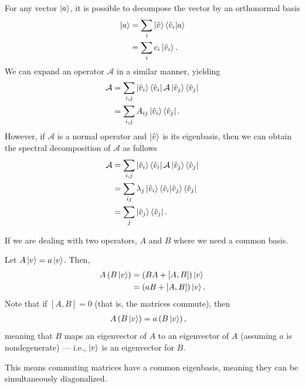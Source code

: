 \documentclass[10pt]{mypackage}
\begin{document}
\begin{example}
  For any vector $\ket{a}$, it is possible to decompose the vector by an orthonormal basis
  \begin{align*}
    \ket{a} &= \sum_{i}\ket{\hat{v}}\braket{\hat{v}_i}{a}\\
            &= \sum_{i}c_i\ket{\hat{v}_i}.
  \end{align*}
  We can expand an operator $\mathcal{A}$ in a similar manner, yielding
  \begin{align*}
    \mathcal{A} &= \sum_{i,j}\ket{\hat{v}_i}\bra{\hat{v}_i}\mathcal{A}\ket{\hat{v}_j}\bra{\hat{v}_j}\\
                &= \sum_{i,j}A_{ij}\ket{\hat{v}_i}\bra{\hat{v}_j}.
  \end{align*}
  However, if $\mathcal{A}$ is a normal operator and $\ket{\hat{v}}$ is its eigenbasis, then we can obtain the spectral decomposition of $\mathcal{A}$ as follows
  \begin{align*}
    \mathcal{A} &= \sum_{i,j}\ket{\hat{v}_i}\bra{\hat{v}_i}\mathcal{A}\ket{\hat{v}_j}\bra{\hat{v}_j}\\
                &= \sum_{ij}\lambda_{j}\ket{\hat{v}_i}\braket{\hat{v}_i}{\hat{v}_j}\bra{\hat{v}_j}\\
                &= \sum_{j}\ket{\hat{v}_j}\bra{\hat{v}_j}.
  \end{align*}
  
\end{example}
If we are dealing with two operators, $A$ and $B$ where we need a common basis.\newline

Let $A \ket{v} = a\ket{v}$. Then,
\begin{align*}
  A\left(B\ket{v}\right) &= \left(BA + \left[A,B\right]\right)\ket{v}\\
                         &= \left(aB + \left[A,B\right]\right)\ket{v}.
\end{align*}
Note that if $\left[A,B\right] = 0$ (that is, the matrices commute), then
\begin{align*}
  A\left(B\ket{v}\right) &= a\left(B\ket{v}\right),
\end{align*}
meaning that $B$ maps an eigenvector of $A$ to an eigenvector of $A$ (assuming $a$ is nondegenerate) --- i.e., $\ket{v}$ is an eigenvector for $B$.\newline

This means commuting matrices have a common eigenbasis, meaning they can be simultaneously diagonalized.\newline
\end{document}
